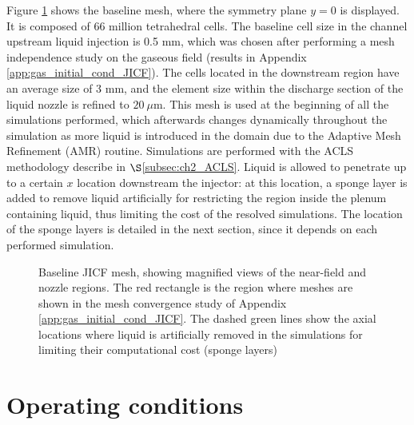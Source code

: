 Figure \ref{fig:jicf_dlr_mesh} shows the baseline mesh, where the symmetry plane $y = 0$ is displayed. It is composed of 66 million tetrahedral cells. The baseline cell size in the channel upstream liquid injection is 0.5 mm, which was chosen after performing a mesh independence study on the gaseous field (results in Appendix \ref{app:gas_initial_cond_JICF}). The cells located in the downstream region have an average size of 3 mm, and the element size within the discharge section of the liquid nozzle is refined to $20~\mu$m. This mesh is used at the beginning of all the simulations performed, which afterwards changes dynamically throughout the simulation as more liquid is introduced in the domain due to the Adaptive Mesh Refinement (AMR) routine. Simulations are performed with the ACLS methodology describe in $\S$\ref{subsec:ch2_ACLS}. Liquid is allowed to penetrate up to a certain $x$ location downstream the injector: at this location, a sponge layer is added to remove liquid artificially for restricting the region inside the plenum containing liquid, thus limiting the cost of the resolved simulations. The location of the sponge layers is detailed in the next section, since it depends on each performed simulation.

\begin{figure}[h!]
	\centering	{}
	\caption[Baseline JICF mesh, showing magnified views of the near-field and nozzle regions.]{Baseline JICF mesh, showing magnified views of the near-field and nozzle regions. The red rectangle is the region where meshes are shown in the mesh convergence study of Appendix \ref{app:gas_initial_cond_JICF}. The dashed green lines show the axial locations where liquid is artificially removed in the simulations for limiting their computational cost (sponge layers)}
	\label{fig:jicf_dlr_mesh}
\end{figure}





\section{Operating conditions}
\label{sec:JICF_SPS_OPs_detailed}

